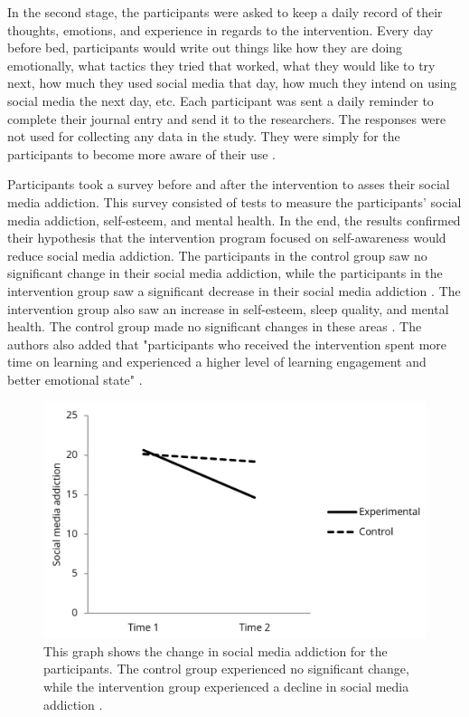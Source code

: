 \documentclass[12pt, journal, compsoc]{IEEEtran}
\begin{document}
In the second stage, the participants were asked to keep a daily record of their thoughts, emotions, and experience in regards to the intervention. Every day before bed, participants would write out things like how they are doing emotionally, what tactics they tried that worked, what they would like to try next, how much they used social media that day, how much they intend on using social media the next day, etc. Each participant was sent a daily reminder to complete their journal entry and send it to the researchers. The responses were not used for collecting any data in the study. They were simply for the participants to become more aware of their use \cite{Intervention}. 

Participants took a survey before and after the intervention to asses their social media addiction. This survey consisted of tests to measure the participants' social media addiction, self-esteem, and mental health. In the end, the results confirmed their hypothesis that the intervention program focused on self-awareness would reduce social media addiction. The participants in the control group saw no significant change in their social media addiction, while the participants in the intervention group saw a significant decrease in their social media addiction \cite{Intervention}. The intervention group also saw an increase in self-esteem, sleep quality, and mental health. The control group made no significant changes in these areas \cite{Intervention}. The authors also added that "participants who received the intervention spent more time on learning and experienced a higher level of learning engagement and better emotional state" \cite{Intervention}.

\begin{figure}[h]
    \noindent\includegraphics[width = \linewidth]{experiment.png}
    \caption{This graph shows the change in social media addiction for the participants. The control group experienced no significant change, while the intervention group experienced a decline in social media addiction \cite{Intervention}.}
\end{figure}
\end{document}
